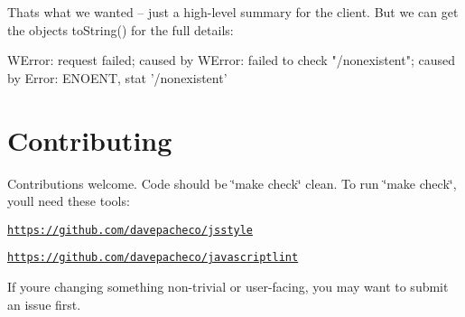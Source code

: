 That\textquotesingle{}s what we wanted -- just a high-\/level summary for the client. But we can get the object\textquotesingle{}s to\+String() for the full details\+: \begin{DoxyVerb}WError: request failed; caused by WError: failed to check "/nonexistent";
caused by Error: ENOENT, stat '/nonexistent'
\end{DoxyVerb}


\section*{Contributing}

Contributions welcome. Code should be \char`\"{}make check\char`\"{} clean. To run \char`\"{}make check\char`\"{}, you\textquotesingle{}ll need these tools\+:


\begin{DoxyItemize}
\item \href{https://github.com/davepacheco/jsstyle}{\tt https\+://github.\+com/davepacheco/jsstyle}
\item \href{https://github.com/davepacheco/javascriptlint}{\tt https\+://github.\+com/davepacheco/javascriptlint}
\end{DoxyItemize}

If you\textquotesingle{}re changing something non-\/trivial or user-\/facing, you may want to submit an issue first. 